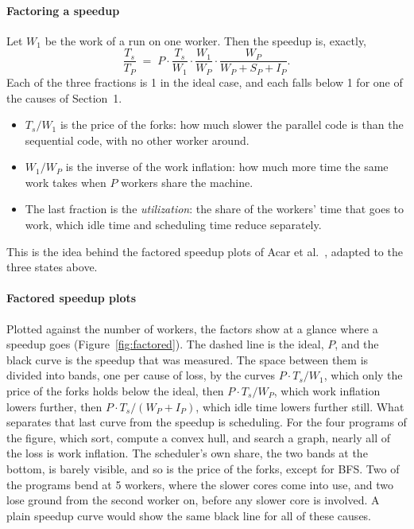 \documentclass[sigplan,nonacm]{acmart}
\begin{document}
\paragraph{Factoring a speedup}
%
Let $W_1$ be the work of a run on one worker.
%
Then the speedup is, exactly,
\[
\frac{T_s}{T_P} \;=\; P \cdot \frac{T_s}{W_1} \cdot \frac{W_1}{W_P}
  \cdot \frac{W_P}{W_P + S_P + I_P}.
\]
%
Each of the three fractions is 1 in the ideal case, and each falls
below 1 for one of the causes of Section~1.
%
\begin{itemize}[leftmargin=*]
\item $T_s/W_1$ is the price of the forks: how much slower the
  parallel code is than the sequential code, with no other worker
  around.
\item $W_1/W_P$ is the inverse of the work inflation: how much more
  time the same work takes when $P$ workers share the machine.
\item The last fraction is the \emph{utilization}: the share of the
  workers' time that goes to work, which idle time and scheduling time
  reduce separately.
\end{itemize}
%
This is the idea behind the factored speedup plots of Acar et
al.~\cite{acar2017inflation}, adapted to the three states above.
%
\paragraph{Factored speedup plots}
%
Plotted against the number of workers, the factors show at a glance
where a speedup goes (Figure~\ref{fig:factored}).
%
The dashed line is the ideal, $P$, and the black curve is the speedup
that was measured.
%
The space between them is divided into bands, one per cause of loss,
by the curves $P \cdot T_s/W_1$, which only the price of the forks
holds below the ideal, then $P \cdot T_s/W_P$, which work inflation
lowers further, then $P \cdot T_s/(W_P + I_P)$, which idle time lowers
further still.
%
What separates that last curve from the speedup is scheduling.
%
For the four programs of the figure, which sort, compute a convex
hull, and search a graph, nearly all of the loss is work inflation.
%
The scheduler's own share, the two bands at the bottom, is barely
visible, and so is the price of the forks, except for BFS.
%
Two of the programs bend at 5 workers, where the slower cores come
into use, and two lose ground from the second worker on, before any
slower core is involved.
%
A plain speedup curve would show the same black line for all of these
causes.
\end{document}
